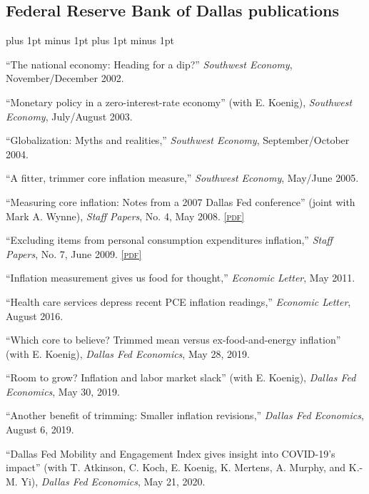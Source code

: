 \documentclass[letterpaper]{article}
\renewenvironment{itemize}{
  \begin{list}{}{
    \setlength{\leftmargin}{1.5em}
    \itemsep -1pt plus 1pt minus 1pt
    \topsep -1pt plus 1pt minus 1pt
  }
}{
  \end{list}
}
\newcommand{\pdf}[1]{\href{#1}{\scriptsize\textsc{[pdf]}}}
\begin{document}
\subsection*{Federal Reserve Bank of Dallas publications}
\begin{itemize}
\item ``The national economy: Heading for a dip?'' \textit{Southwest Economy}, November/December 2002.

\item ``Monetary policy in a zero-interest-rate economy'' (with E. Koenig), \textit{Southwest Economy}, July/August 2003.

\item ``Globalization: Myths and realities,'' \textit{Southwest Economy}, September/October 2004.

\item ``A fitter, trimmer core inflation measure,'' \textit{Southwest Economy}, May/June 2005.

\item ``Measuring core inflation: Notes from a 2007 Dallas Fed conference'' (joint with Mark A. Wynne), \textit{Staff Papers}, No. 4, May 2008. \pdf{http://www.dallasfed.org/assets/documents/research/staff/staff0802.pdf}

\item ``Excluding items from personal consumption expenditures inflation,'' \textit{Staff Papers}, No. 7, June 2009. \pdf{http://www.dallasfed.org/assets/documents/research/staff/staff0901.pdf}

\item ``Inflation measurement gives us food for thought,'' \textit{Economic Letter}, May 2011.

\item ``Health care services depress recent PCE inflation readings,'' \textit{Economic Letter}, August 2016.

\item ``Which core to believe? Trimmed mean versus ex-food-and-energy inflation'' (with E. Koenig), \textit{Dallas Fed Economics}, May 28, 2019.

\item ``Room to grow? Inflation and labor market slack'' (with E. Koenig), \textit{Dallas Fed Economics}, May 30, 2019.

\item ``Another benefit of trimming: Smaller inflation revisions,'' \textit{Dallas Fed Economics}, August 6, 2019.

\item ``Dallas Fed Mobility and Engagement Index gives insight into COVID-19's impact'' (with T. Atkinson, C. Koch, E. Koenig, K. Mertens, A. Murphy, and K.-M. Yi), \textit{Dallas Fed Economics}, May 21, 2020.


\end{itemize}
\end{document}
